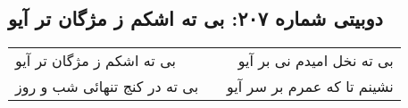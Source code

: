 \begin{center}
\section*{دوبیتی شماره ۲۰۷: بی ته اشکم ز مژگان تر آیو}
\label{sec:207}
\begin{longtable}{l p{0.5cm} r}
بی ته اشکم ز مژگان تر آیو
&&
بی ته نخل امیدم نی بر آیو
\\
بی ته در کنج تنهائی شب و روز
&&
نشینم تا که عمرم بر سر آیو
\\
\end{longtable}
\end{center}
